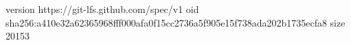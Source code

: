 version https://git-lfs.github.com/spec/v1
oid sha256:a410e32a62365968fff000afa0f15cc2736a5f905e15f738ada202b1735ecfa8
size 20153
